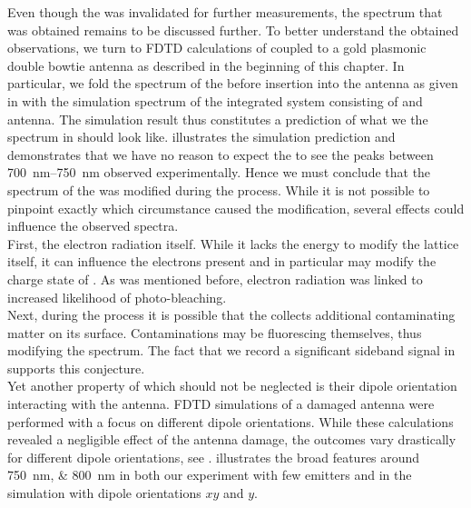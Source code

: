 				Even though the \nd was invalidated for further measurements, the spectrum that was obtained remains to be discussed further. To better understand the obtained observations, we turn to FDTD calculations of \nd coupled to a gold plasmonic double bowtie antenna as described in the beginning of this chapter. In particular, we fold the spectrum of the \nd before insertion into the antenna as given in  with the simulation spectrum of the integrated system consisting of \nd and antenna. The simulation result thus constitutes a prediction of what we the spectrum in  should look like.  illustrates the simulation prediction and demonstrates that we have no reason to expect the to see the peaks between \SIrange{700}{750}{nm} observed experimentally. Hence we must conclude that the spectrum of the \nd was modified during the \pp process. While it is not possible to pinpoint exactly which circumstance caused the modification, several effects could influence the observed spectra.
				\\
				First, the electron radiation itself. While it lacks the energy to modify the lattice itself, it can influence the electrons present and in particular may modify the charge state of \sivs. As was mentioned before, electron radiation was linked to increased likelihood of photo-bleaching.
				\\
				Next, during the \pp process it is possible that the \nd collects additional contaminating matter on its surface. Contaminations may be fluorescing themselves, thus modifying the spectrum. The fact that we record a significant sideband signal in  supports this conjecture.
				\\
				Yet another property of \sivs which should not be neglected is their dipole orientation interacting with the antenna.
				FDTD simulations of a damaged antenna were performed with a focus on different dipole orientations.
				While these calculations revealed a negligible effect of the antenna damage, the outcomes vary drastically for different dipole orientations, see .
				 illustrates the broad features around \SIlist{750;800}{nm} in both our experiment with few emitters and in the simulation with dipole orientations $xy$ and $y$.
